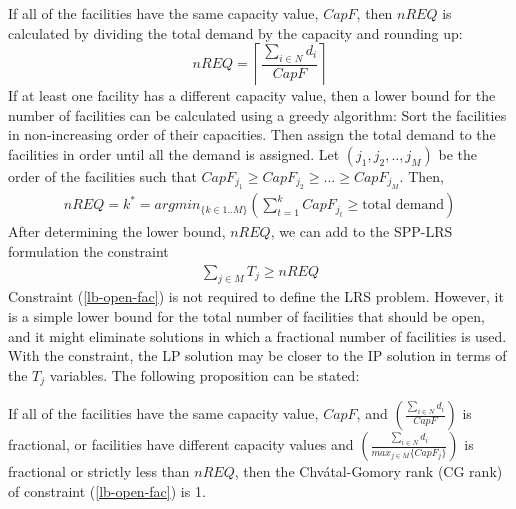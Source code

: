 {} If all of the facilities have the same capacity value, $CapF$, then  $nREQ$ 
is calculated by dividing the total demand by the capacity and rounding up:
\begin{equation}
nREQ =\left \lceil \frac{\sum_{i \in N }d_i}{CapF} \right \rceil\nonumber
\end{equation}
{} If at least one facility has a different capacity value,  
then a lower bound for the number of facilities can be calculated using a greedy 
algorithm: Sort the facilities in non-increasing order of their capacities. Then
assign the total demand to the facilities in order until all the demand is assigned.  
Let $(j_1,j_2,..,j_M)$ be the order of the facilities such that 
$CapF_{j_1}\geq CapF_{j_2} \geq ...\geq CapF_{j_M}$. Then,
\begin{eqnarray*}
 nREQ =k^*=argmin_{\{k \in 1..M\}} \left (\sum_{t=1}^{k}CapF_{j_t}\geq \mbox{total demand} \right )  
\end{eqnarray*}
After determining the lower bound, $nREQ$, we can add to the SPP-LRS formulation 
the constraint
\begin{eqnarray}
\sum_{j \in M} T_{j} \geq nREQ \label{lb-open-fac}
\end{eqnarray}
Constraint (\ref{lb-open-fac}) is not required to define the LRS problem. However, it is a simple
lower bound for the total number of facilities that should be open, and it might eliminate solutions
in which a fractional number of facilities is used. With the constraint, the LP solution may be closer 
to the IP solution in terms of the $T_j$ variables. The following proposition can be stated:



 

\begin {prop} If all of the facilities have the same capacity value, $CapF$, and 
$\left (\frac{\sum_{i \in N }d_i}{CapF}\right)$ is fractional, or facilities have
different capacity values and $\left (\frac{\sum_{i \in N }d_i}{max_{j \in M}\{CapF_j\}}\right)$
is fractional or strictly less than $nREQ$, then the 
Chv\'atal-Gomory rank (CG rank) of constraint (\ref{lb-open-fac}) is 1. 
\end {prop}

